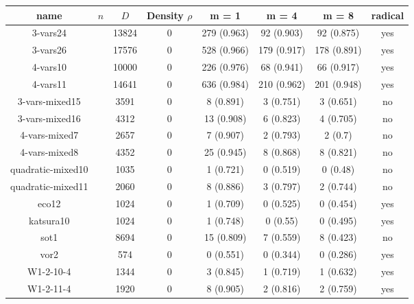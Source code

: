 \documentclass[12pt]{article}
\begin{document}
	\begin{tabular}{c|c|c|c|c|c|c|c}
		\textbf{name}& $n$ & $D$ & \textbf{Density $\rho$} & m = 1 & m = 4 & m = 8 & \textbf{radical} \\
		\hline
	
	3-vars24& &13824&0&279 (0.963)&92 (0.903)&92 (0.875)&yes\\
	3-vars26& &17576&0&528 (0.966)&179 (0.917)&178 (0.891)&yes\\
	4-vars10& &10000&0&226 (0.976)&68 (0.941)&66 (0.917)&yes\\
	4-vars11& &14641&0&636 (0.984)&210 (0.962)&201 (0.948)&yes\\
	3-vars-mixed15& &3591&0&8 (0.891)&3 (0.751)&3 (0.651)&no\\
	3-vars-mixed16& &4312&0&13 (0.908)&6 (0.823)&4 (0.705)&no\\
	4-vars-mixed7& &2657&0&7 (0.907)&2 (0.793)&2 (0.7)&no\\
	4-vars-mixed8& &4352&0&25 (0.945)&8 (0.868)&8 (0.821)&no\\
	quadratic-mixed10& &1035&0&1 (0.721)&0 (0.519)&0 (0.48)&no\\
	quadratic-mixed11& &2060&0&8 (0.886)&3 (0.797)&2 (0.744)&no\\
	eco12& &1024&0&1 (0.709)&0 (0.525)&0 (0.454)&yes\\
	katsura10& &1024&0&1 (0.748)&0 (0.55)&0 (0.495)&yes\\
	sot1& &8694&0&15 (0.809)&7 (0.559)&8 (0.423)&no\\
	vor2& &574&0&0 (0.551)&0 (0.344)&0 (0.286)&yes\\
	W1-2-10-4& &1344&0&3 (0.845)&1 (0.719)&1 (0.632)&yes\\
	W1-2-11-4& &1920&0&8 (0.905)&2 (0.816)&2 (0.759)&yes\\
\end{tabular}
\end{document}
